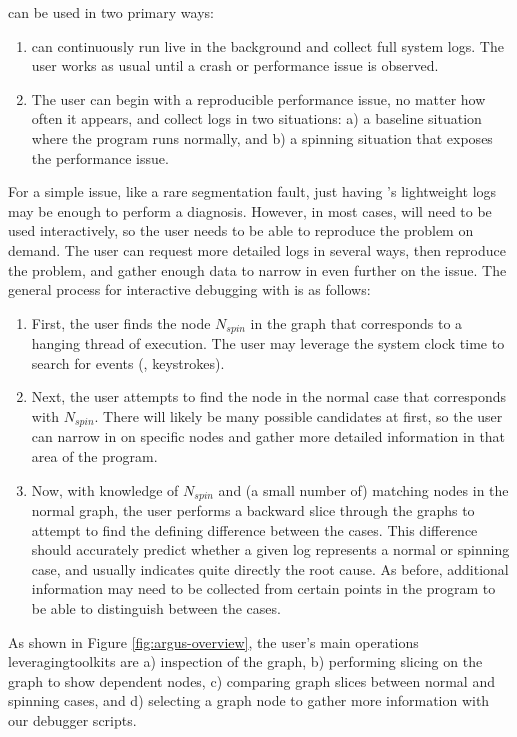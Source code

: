 \xxx can be used in two primary ways:
\begin{enumerate}
    \item \xxx can continuously run live in the background and collect full
    system logs. The user works as usual until a crash or performance issue is
    observed.

    \item The user can begin with a reproducible performance issue, no matter how often it appears, and collect
    logs in two situations: a) a baseline situation where the program runs
    normally, and b) a spinning situation that exposes the performance issue.

\end{enumerate}
For a simple issue, like a rare segmentation fault, just having \xxx's lightweight logs may be enough to perform a diagnosis.
However, in most cases, \xxx will need to be used interactively, so the user needs to be able to
reproduce the problem on demand.
The user can request more detailed logs in several ways, then reproduce the problem, and gather enough data to narrow in even further on the issue.
The general process for interactive debugging with \xxx is as follows:
\begin{enumerate}
    \item First, the user finds the node \emph{$N_{spin}$} in the \xxx graph
    that corresponds to a hanging thread of execution. The user may leverage
    the system clock time to search for events (\eg, keystrokes).

    \item Next, the user attempts to find the node in the normal case that
    corresponds with $N_{spin}$. There will likely be many possible candidates
    at first, so the user can narrow in on specific nodes and gather more
    detailed information in that area of the program.

    \item Now, with knowledge of $N_{spin}$ and (a small number of) matching
    nodes in the normal graph, the user performs a backward slice through the
    graphs to attempt to find the defining difference between the cases. This
    difference should accurately predict whether a given log represents a
    normal or spinning case, and usually indicates quite directly the root
    cause. As before, additional information may need to be collected from
    certain points in the program to be able to distinguish between the cases.

\end{enumerate}
As shown in Figure \ref{fig:argus-overview}, the user's main operations leveraging\xxx toolkits are
a) inspection of the graph,
b) performing slicing on the graph to show dependent nodes,
c) comparing graph slices between normal and spinning cases, and
d) selecting a graph node to gather more information with our debugger scripts.

